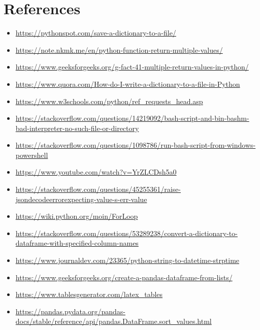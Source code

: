 \documentclass[12pt]{article}
\begin{document}
\section*{References}
\begin{itemize}
    \item { \url{https://pythonspot.com/save-a-dictionary-to-a-file/}}
    \item {\url{https://note.nkmk.me/en/python-function-return-multiple-values/}}
    \item {\url{https://www.geeksforgeeks.org/g-fact-41-multiple-return-values-in-python/}}
    \item { \url{https://www.quora.com/How-do-I-write-a-dictionary-to-a-file-in-Python}}
    \item { \url{https://www.w3schools.com/python/ref_requests_head.asp}}
    \item { \url{https://stackoverflow.com/questions/14219092/bash-script-and-bin-bashm-bad-interpreter-no-such-file-or-directory}}
    \item { \url{https://stackoverflow.com/questions/1098786/run-bash-script-from-windows-powershell}}
    \item { \url{https://www.youtube.com/watch?v=YrZLCDsh5a0}}
    \item { \url{https://stackoverflow.com/questions/45255361/raise-jsondecodeerrorexpecting-value-s-err-value}}
    \item { \url{https://wiki.python.org/moin/ForLoop}}
    \item { \url{https://stackoverflow.com/questions/53289238/convert-a-dictionary-to-dataframe-with-specified-column-names}}
    \item { \url{https://www.journaldev.com/23365/python-string-to-datetime-strptime}}
    \item { \url{https://www.geeksforgeeks.org/create-a-pandas-dataframe-from-lists/}}
    \item {\url{https://www.tablesgenerator.com/latex_tables}}
    \item {\url{https://pandas.pydata.org/pandas-docs/stable/reference/api/pandas.DataFrame.sort_values.html}}

\end{itemize}
\end{document}
